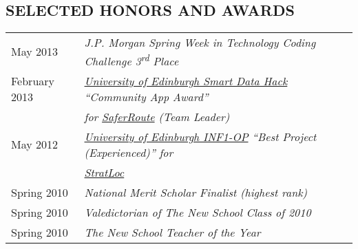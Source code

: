 \documentclass[line, margin]{res}
\newcommand{\ts}{\textsuperscript}
\begin{document}
\begin{resume}
\section{SELECTED HONORS AND AWARDS}
\begin{tabular}{@{}l l}
May 2013 & \textit{J.P. Morgan Spring Week in Technology Coding Challenge 3\ts{rd} Place}\linebreak \\[5pt]
February 2013 & \textit{\href{http://data.inf.ed.ac.uk/ilwhack/finalprojects.php}{University of Edinburgh Smart Data Hack} ``Community App Award''}\linebreak\\[1pt] 
&\textit{for \href{https://github.com/team-tusive/ilwhack}{SaferRoute} (Team Leader)} \linebreak \\[5pt]
May 2012 & \textit{\href{https://sites.google.com/site/2012oop/winners}{University of Edinburgh INF1-OP} ``Best Project (Experienced)'' for} \linebreak \\[1pt] 
 &\textit{\href{http://www.chasestevens.com/team2civ/}{StratLoc}} \linebreak \\[5pt]
Spring 2010 & \textit{National Merit Scholar Finalist (highest rank)} \\[5pt]
Spring 2010 & \textit{Valedictorian of The New School Class of 2010} \\[5pt]
Spring 2010 & \textit{The New School Teacher of the Year} \\[5pt]
\end{tabular}
\end{resume}
\end{document}
